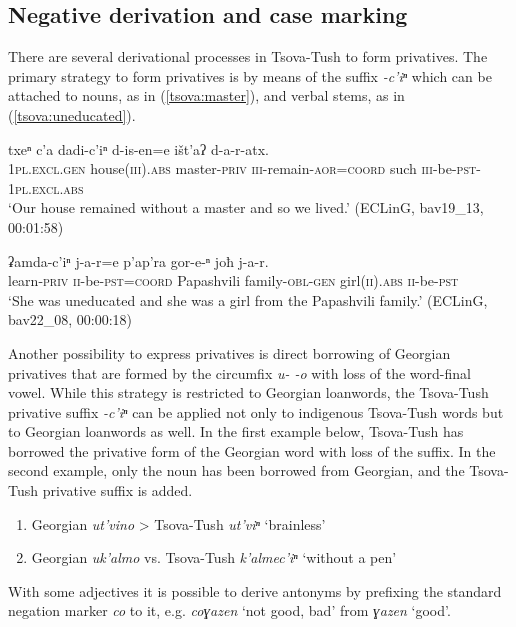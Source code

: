 \documentclass[output=paper,%
colorlinks,citecolor=brown,
showindex
]{langscibook}
\begin{document}
\subsection{Negative derivation and case marking}
\label{tsova:derivation}

There are several derivational processes in Tsova-Tush to form privatives.
The primary strategy to form privatives is by means of the suffix \textit{-c'iⁿ} which can be attached to nouns, as in (\ref{tsova:master}), and verbal stems, as in (\ref{tsova:uneducated}). 

\ea	\label{tsova:master}
\gll 	txeⁿ c'a dadi-c'iⁿ d-is-en=e išt'aʔ d-a-r-atx.\\  
	\textsc{1pl.excl.gen} house\textsc{(iii).abs} master-\textsc{priv} \textsc{iii}-remain-\textsc{aor}=\textsc{coord} such \textsc{iii}-be-\textsc{pst}-\textsc{1pl.excl.abs}\\
\glt `Our house remained without a master and so we lived.' (ECLinG, bav19\_13, 00:01:58)
\z

\ea	\label{tsova:uneducated}
\gll 	ʡamda-c’iⁿ	j-a-r=e	p’ap’ra	gor-e-ⁿ	joħ	j-a-r.\\  
	learn-\textsc{priv} \textsc{ii}-be-\textsc{pst}=\textsc{coord} Papashvili family-\textsc{obl-gen} girl\textsc{(ii).abs} \textsc{ii}-be-\textsc{pst}\\
\glt `She was uneducated and she was a girl from the Papashvili family.' (ECLinG, bav22\_08, 00:00:18)
\z

Another possibility to express privatives is direct borrowing of Georgian privatives that are formed by the circumfix \textit{u- -o} with loss of the word-final vowel. While this strategy is restricted to Georgian loanwords, the Tsova-Tush privative suffix \textit{-c'iⁿ} can be applied not only to indigenous Tsova-Tush words but to Georgian loanwords as well. In the first example below, Tsova-Tush has borrowed the privative form of the Georgian word with loss of the suffix. In the second example, only the noun has been borrowed from Georgian, and the Tsova-Tush privative suffix is added.

\begin{enumerate}
\item Georgian \textit{ut'vino} > Tsova-Tush \textit{ut'viⁿ}  `brainless' 
\item Georgian \textit{uk'almo} vs. Tsova-Tush \textit{k'almec'iⁿ}  `without a pen' 
\end{enumerate}

With some adjectives it is possible to derive antonyms by prefixing the standard negation marker \textit{co} to it, e.g. \textit{coɣazen} `not good, bad' from \textit{ɣazen} `good'. 
\end{document}
